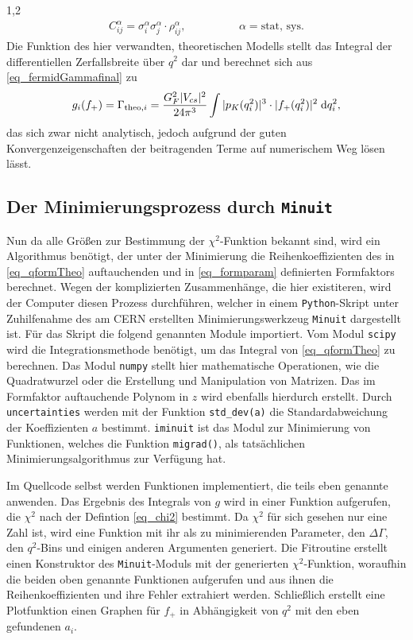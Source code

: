 \documentclass[11pt,a4paper,twoside,draft]{report}
\begin{document}
\begin{spacing}{1,2}
\begin{align}
 C^{\alpha}_{ij} = \sigma^{\alpha}_i \sigma^{\alpha}_j \cdot \rho^{\alpha}_{ij}, \hspace{2cm}\alpha = \text{stat, sys}.
\end{align}
Die Funktion des hier verwandten, theoretischen Modells stellt das Integral der differentiellen Zerfallsbreite über $q^2$ dar und berechnet sich aus 
\eqref{eq_fermidGammafinal} zu
\begin{align}
 g_i(f_+) = \Gamma_{\text{theo},i} = \frac{G_F^2 |V_{cs}|^2}{24\pi^3}\int|p_K(q_i^2)|^3 \cdot |f_+(q^2_i)|^2\; \mathrm{d} q_i^2,
 \label{eq_qformTheo}
\end{align}
das sich zwar nicht analytisch, jedoch aufgrund der guten Konvergenzeigenschaften der beitragenden Terme auf numerischem Weg lösen lässt. 

\subsection{Der Minimierungsprozess durch \texttt{Minuit}}
Nun da alle Größen zur Bestimmung der $\chi^2$-Funktion bekannt sind, wird ein Algorithmus benötigt, der unter der Minimierung die Reihenkoeffizienten
des in \eqref{eq_qformTheo} auftauchenden und in \eqref{eq_formparam} definierten Formfaktors berechnet. Wegen der komplizierten Zusammenhänge, die hier
existiteren, wird der Computer diesen Prozess durchführen, welcher in einem \texttt{Python}-Skript unter Zuhilfenahme des am CERN erstellten 
Minimierungswerkzeug \texttt{Minuit} dargestellt ist. Für das Skript die folgend genannten Module importiert.
Vom Modul \texttt{scipy} wird die Integrationsmethode benötigt, um das Integral von \eqref{eq_qformTheo} zu berechnen. 
Das Modul \texttt{numpy} stellt hier
mathematische Operationen, wie die Quadratwurzel oder die Erstellung und Manipulation von Matrizen. Das im Formfaktor auftauchende Polynom in $z$ wird
ebenfalls hierdurch erstellt. Durch \texttt{uncertainties} werden mit der Funktion \texttt{std\_dev(a)} die Standardabweichung der Koeffizienten $a$ bestimmt.
\texttt{iminuit} ist das Modul zur Minimierung von Funktionen, welches die Funktion \texttt{migrad()}, als tatsächlichen
Minimierungsalgorithmus zur Verfügung hat. 

\noindent
Im Quellcode selbst werden Funktionen implementiert, die teils eben genannte anwenden. Das Ergebnis des Integrals von $g$ wird in einer Funktion aufgerufen,
die $\chi^2$ nach der Defintion \eqref{eq_chi2} bestimmt. Da $\chi^2$ für sich gesehen nur eine Zahl ist, wird eine Funktion mit ihr als zu minimierenden
Parameter, den $\Delta \Gamma$, den $q^2$-Bins und einigen anderen Argumenten generiert. Die Fitroutine erstellt einen Konstruktor des \texttt{Minuit}-Moduls mit 
der generierten $\chi^2$-Funktion, woraufhin die beiden oben genannte Funktionen aufgerufen und aus ihnen die Reihenkoeffizienten und ihre Fehler 
extrahiert werden. Schließlich erstellt eine Plotfunktion einen Graphen für $f_+$ in Abhängigkeit von $q^2$ mit den eben gefundenen $a_i$. 


\end{spacing}
\end{document}
